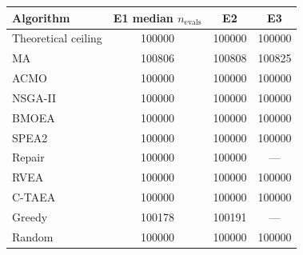 \begin{tabular}{@{}lccc@{}}
\toprule
Algorithm & E1 median $n_{\mathrm{evals}}$ & E2 & E3 \\
\midrule
Theoretical ceiling & 100000 & 100000 & 100000 \\
\midrule
MA & 100806 & 100808 & 100825 \\
ACMO & 100000 & 100000 & 100000 \\
NSGA-II & 100000 & 100000 & 100000 \\
BMOEA & 100000 & 100000 & 100000 \\
SPEA2 & 100000 & 100000 & 100000 \\
Repair & 100000 & 100000 & --- \\
RVEA & 100000 & 100000 & 100000 \\
C-TAEA & 100000 & 100000 & 100000 \\
Greedy & 100178 & 100191 & --- \\
Random & 100000 & 100000 & 100000 \\
\bottomrule
\end{tabular}